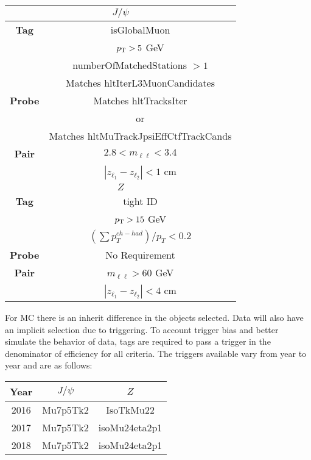 \begin{tabular}{|c|c|c|}
\hline 
\multicolumn{3}{|c|}{$J/\psi$} \\ 
\hline 
\textbf{Tag} & \multicolumn{2}{c|}{ isGlobalMuon } \\
	& \multicolumn{2}{c|}{ $p_{\mathrm{T}} > 5$ GeV} \\ 
	& \multicolumn{2}{c|}{ numberOfMatchedStations $> 1$} \\
	& \multicolumn{2}{c|}{ Matches hltIterL3MuonCandidates} \\
\hline 
\textbf{Probe} & \multicolumn{2}{c|}{Matches hltTracksIter} \\ 
	  & \multicolumn{2}{c|}{ or } \\
	  & \multicolumn{2}{c|}{Matches hltMuTrackJpsiEffCtfTrackCands } \\
\hline 
\textbf{Pair} & \multicolumn{2}{c|}{$ 2.8 < m_{\ell\ell} < 3.4$} \\
	 & \multicolumn{2}{c|}{$ | z_{\ell_1} - z_{\ell_2} | < 1 $ cm } \\
\hline 
\multicolumn{3}{|c|}{$Z$} \\ 
\hline 
\textbf{Tag} & \multicolumn{2}{c|}{tight ID} \\
			& \multicolumn{2}{c|}{$p_{\mathrm{T}} > 15$ GeV} \\
			& \multicolumn{2}{c|}{ $(\sum p_T^{ch-had})/p_T < 0.2$ } \\
\hline 
\textbf{Probe} & \multicolumn{2}{c|}{No Requirement} \\ 
\hline 
\textbf{Pair} & \multicolumn{2}{c|}{$m_{\ell\ell} > 60$ GeV} \\ 
			  & \multicolumn{2}{c|}{$|z_{\ell_1} - z_{\ell_2}| < 4$ cm} \\
\hline 
\end{tabular} 




For MC there is an inherit difference in the objects selected. Data will also have an implicit selection due to triggering. To account trigger bias and better simulate the behavior of data, tags are required to pass a trigger in the denominator of efficiency for all criteria. The triggers available vary from year to year and are as follows:\\

\begin{tabular}{|c|c|c|}
\hline 
Year & $J/\psi$ & $Z$ \\ 
\hline 
2016 & Mu7p5Tk2 &  IsoTkMu22 \\ 
\hline 
2017 & Mu7p5Tk2 & isoMu24eta2p1 \\ 
\hline 
2018 & Mu7p5Tk2 & isoMu24eta2p1 \\ 
\hline 
\end{tabular} 



